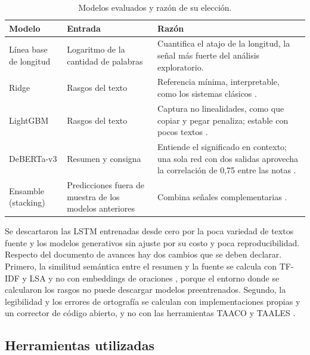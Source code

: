 \documentclass[11pt,a4paper]{article}
\begin{document}
\begin{table}[ht]
\centering\footnotesize
\caption{Modelos evaluados y razón de su elección.}
\label{tab:seleccion}
\begin{tabular}{P{3.0cm}P{4.2cm}P{6.3cm}}
\toprule
Modelo & Entrada & Razón \\
\midrule
Línea base de longitud & Logaritmo de la cantidad de palabras & Cuantifica el atajo de la longitud, la señal más fuerte del análisis exploratorio. \\
Ridge & Rasgos del texto & Referencia mínima, interpretable, como los sistemas clásicos \citep{attali2006}. \\
LightGBM & Rasgos del texto & Captura no linealidades, como que copiar y pegar penaliza; estable con pocos textos \citep{shwartz2022}. \\
DeBERTa-v3 & Resumen y consigna & Entiende el significado en contexto; una sola red con dos salidas aprovecha la correlación de 0,75 entre las notas \citep{xue2021}. \\
Ensamble (stacking) & Predicciones fuera de muestra de los modelos anteriores & Combina señales complementarias \citep{wolpert1992}. \\
\bottomrule
\end{tabular}
\end{table}

Se descartaron las LSTM entrenadas desde cero \citep{taghipour2016} por la poca variedad de textos fuente y los modelos generativos sin ajuste \citep{mizumoto2023} por su costo y poca reproducibilidad. Respecto del documento de avances hay dos cambios que se deben declarar. Primero, la similitud semántica entre el resumen y la fuente se calcula con TF-IDF y LSA \citep{landauer1998} y no con embeddings de oraciones \citep{reimers2019}, porque el entorno donde se calcularon los rasgos no puede descargar modelos preentrenados. Segundo, la legibilidad y los errores de ortografía se calculan con implementaciones propias y un corrector de código abierto, y no con las herramientas TAACO y TAALES \citep{crossley2016,kyle2018}.

\subsection{Herramientas utilizadas}
\end{document}

